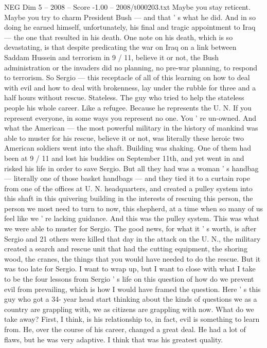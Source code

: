 \begin{textsample}{NEG Dim 5 – 2008 – Score -1.00 – 2008/t000203.txt}
Maybe you stay reticent.
Maybe you try to charm President Bush — and that ' s what he did.
And in so doing he earned himself, unfortunately, his final and tragic appointment to Iraq — the one that resulted in his death.
One note on his death, which is so devastating, is that despite predicating the war on Iraq on a link between Saddam Hussein and terrorism in 9 / 11, believe it or not, the Bush administration or the invaders did no planning, no pre-war planning, to respond to terrorism.
So Sergio — this receptacle of all of this learning on how to deal with evil and how to deal with brokenness, lay under the rubble for three and a half hours without rescue.
Stateless.
The guy who tried to help the stateless people his whole career.
Like a refugee.
Because he represents the U.
N.
If you represent everyone, in some ways you represent no one.
You ' re un-owned.
And what the American — the most powerful military in the history of mankind was able to muster for his rescue, believe it or not, was literally these heroic two American soldiers went into the shaft.
Building was shaking.
One of them had been at 9 / 11 and lost his buddies on September 11th, and yet went in and risked his life in order to save Sergio.
But all they had was a woman ' s handbag — literally one of those basket handbags — and they tied it to a curtain rope from one of the offices at U.
N. headquarters, and created a pulley system into this shaft in this quivering building in the interests of rescuing this person, the person we most need to turn to now, this shepherd, at a time when so many of us feel like we ' re lacking guidance.
And this was the pulley system.
This was what we were able to muster for Sergio.
The good news, for what it ' s worth, is after Sergio and 21 others were killed that day in the attack on the U.
N., the military created a search and rescue unit that had the cutting equipment, the shoring wood, the cranes, the things that you would have needed to do the rescue.
But it was too late for Sergio.
I want to wrap up, but I want to close with what I take to be the four lessons from Sergio ' s life on this question of how do we prevent evil from prevailing, which is how I would have framed the question.
Here ' s this guy who got a 34- year head start thinking about the kinds of questions we as a country are grappling with, we as citizens are grappling with now.
What do we take away?
First, I think, is his relationship to, in fact, evil is something to learn from.
He, over the course of his career, changed a great deal.
He had a lot of flaws, but he was very adaptive.
I think that was his greatest quality.

\end{textsample}
